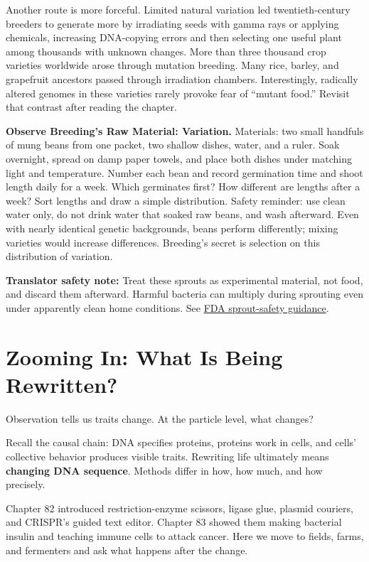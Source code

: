 Another route is more forceful. Limited natural variation led twentieth-century breeders to generate more by irradiating seeds with gamma rays or applying chemicals, increasing DNA-copying errors and then selecting one useful plant among thousands with unknown changes. More than three thousand crop varieties worldwide arose through mutation breeding. Many rice, barley, and grapefruit ancestors passed through irradiation chambers. Interestingly, radically altered genomes in these varieties rarely provoke fear of ``mutant food.'' Revisit that contrast after reading the chapter.

\begin{shiyan}
\textbf{Observe Breeding's Raw Material: Variation.} Materials: two small handfuls of mung beans from one packet, two shallow dishes, water, and a ruler. Soak overnight, spread on damp paper towels, and place both dishes under matching light and temperature. Number each bean and record germination time and shoot length daily for a week. Which germinates first? How different are lengths after a week? Sort lengths and draw a simple distribution. Safety reminder: use clean water only, do not drink water that soaked raw beans, and wash afterward. Even with nearly identical genetic backgrounds, beans perform differently; mixing varieties would increase differences. Breeding's secret is selection on this distribution of variation.
\end{shiyan}

\textbf{Translator safety note:} Treat these sprouts as experimental material, not food, and discard them afterward. Harmful bacteria can multiply during sprouting even under apparently clean home conditions. See \href{https://www.fda.gov/food/buy-store-serve-safe-food/selecting-and-serving-produce-safely}{FDA sprout-safety guidance}.

\section{Zooming In: What Is Being Rewritten?}

Observation tells us traits change. At the particle level, what changes?

Recall the causal chain: DNA specifies proteins, proteins work in cells, and cells' collective behavior produces visible traits. Rewriting life ultimately means \textbf{changing DNA sequence}. Methods differ in how, how much, and how precisely.

Chapter 82 introduced restriction-enzyme scissors, ligase glue, plasmid couriers, and CRISPR's guided text editor. Chapter 83 showed them making bacterial insulin and teaching immune cells to attack cancer. Here we move to fields, farms, and fermenters and ask what happens after the change.

